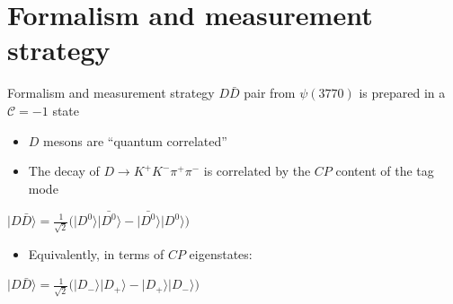 \documentclass{beamer}
\begin{document}
\section{Formalism and measurement strategy}
\begin{frame}{Formalism and measurement strategy}
  \vspace{0.0cm}
  {\Large $D\bar{D}$ pair from $\psi(3770)$ is prepared in a $\mathcal{C} = -1$ state}
  \vspace{0.5cm}
  \begin{itemize}
    \setlength\itemsep{1.0em}
    \item{$D$ mesons are ``quantum correlated''}
    \item{The decay of $D\to K^+K^-\pi^+\pi^-$ is correlated by the $C\!P$ content of the tag mode}
  \end{itemize}
  \begin{center}
    $\lvert D\bar{D}\rangle = \frac{1}{\sqrt{2}}\big(\lvert D^0\rangle\lvert\bar{D^0}\rangle - \lvert\bar{D^0}\rangle\lvert D^0\rangle\big)$
  \end{center}
  \begin{itemize}
    \item{Equivalently, in terms of $C\!P$ eigenstates:}
  \end{itemize}
  \begin{center}
    $\lvert D\bar{D}\rangle = \frac{1}{\sqrt{2}}\big(\lvert D_-\rangle\lvert D_+\rangle - \lvert D_+\rangle\lvert D_-\rangle\big)$
  \end{center}
\end{frame}
\end{document}
